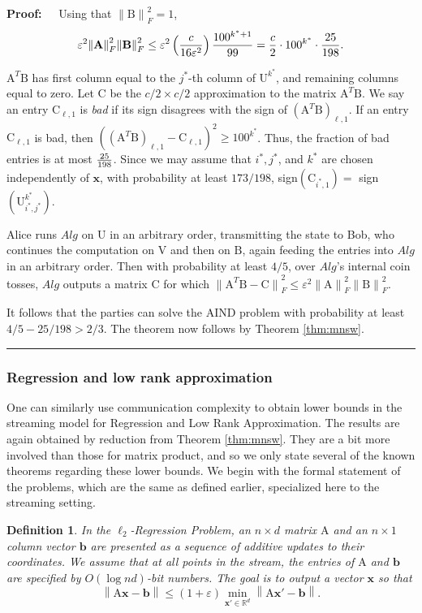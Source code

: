 \documentclass[11pt]{article}
\newtheorem{definition}[theorem]{Definition}
\newenvironment{proof}{\begin{trivlist} \item {\bf Proof:~~}}
  {\qed\end{trivlist}}
\newcommand{\mat}[1]{{\ensuremath{\bm{\mathrm{#1}}}}}
\def\b{{\mathbf b}}
\def\matA{\mat{A}}
\def\matB{\mat{B}}
\def\matC{\mat{C}}
\def\matU{\mat{U}}
\def\matV{\mat{V}}
\def\frac#1#2{{#1\over #2}}
\def\qed{\hfill\rule{2mm}{2mm}}
\def\x{{\mathbf x}}
\def\b{{\mathbf b}}
\def\norm#1{{\left\|#1\right\|}}
\newcommand{\normF}[1]{{\| #1 \|}_F}
\newcommand{\eps}{\varepsilon}
\begin{document}
\begin{proof}
Using that $\normF{\matB}^2 = 1$, 
$$\eps^2 \normF{\matA}^2 \normF{\matB}^2 
\leq \eps^2 \left (\frac{c}{16\eps^2} \right ) \frac{100^{k^*+1}}{99}
= \frac{c}{2} \cdot 100^{k^*} \cdot \frac{25}{198}.
$$

$\matA^T \matB$ has first column equal to the $j^*$-th column of $\matU^{k^*}$, 
and remaining columns equal to zero. Let $\matC$ be the $c/2 \times c/2$ approximation 
to the matrix $\matA^T\matB$. We say an entry
$\matC_{\ell, 1}$ is {\it bad} if its sign disagrees with the sign of $(\matA^T \matB)_{\ell, 1}$. 
If an entry $\matC_{\ell, 1}$ is bad, then 
$((\matA^T\matB)_{\ell, 1} - \matC_{\ell, 1})^2 \geq 100^{k^*}$. Thus, the fraction of bad
entries is at most $\frac{25}{198}$. Since we may assume that $i^*, j^*$, and $k^*$
are chosen independently of $\x$, with probability at least $173/198$, 
sign$(\matC_{i^*, 1}) = $ sign$(\matU^{k^*}_{i^*, j^*})$. 

Alice runs $Alg$ on $\matU$ in an arbitrary order, transmitting the state to Bob, who 
continues the computation on $\matV$ and then on $\matB$, again feeding the entries into 
$Alg$ in an arbitrary order. Then with probability at least $4/5$, over $Alg$'s 
internal coin tosses, $Alg$ outputs a matrix $\matC$ for which 
$\normF{\matA^T\matB-\matC}^2 \leq \eps^2 \normF{\matA}^2 \normF{\matB}^2$. 

It follows that the parties can solve the AIND problem with probability at least
$4/5 - 25/198 > 2/3$. The theorem now follows by Theorem \ref{thm:mnsw}.
\end{proof}

\subsubsection{Regression and low rank approximation}
One can similarly use communication complexity to obtain lower bounds in the streaming
model for Regression and Low Rank Approximation. The results are again obtained by reduction
from Theorem \ref{thm:mnsw}. They are a bit more involved than those for matrix product, and
so we only state several of the known theorems regarding these lower bounds. We begin with
the formal statement of the problems, which are the same as defined earlier, 
specialized here to the streaming setting. 

\begin{definition}
In the {\it $\ell_2$-Regression Problem}, an $n \times d$ matrix $\matA$ and an 
$n \times 1$ column vector $\b$ are presented as a sequence of additive updates to their
coordinates. We assume that at all points in the stream, the entries of $\matA$ and $\b$ 
are specified by $O(\log nd)$-bit 
numbers. The goal is to output a vector $\x$ so that
$$\norm{\matA\x-\b} \leq (1+\eps)\min_{\x' \in \mathbb{R}^d}\norm{\matA\x'-\b}.$$
\end{definition}
\end{document}
